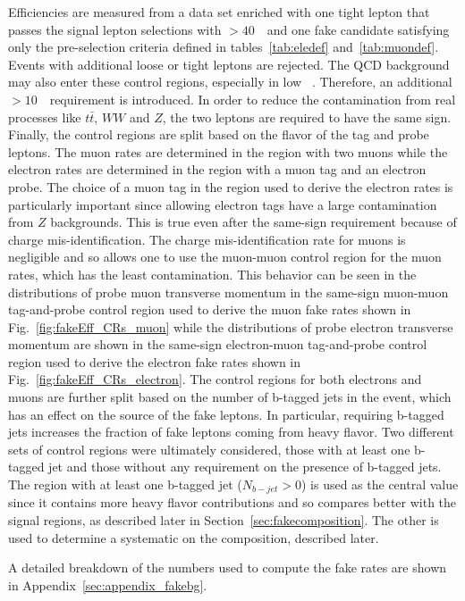 Efficiencies are measured from a data set enriched with one tight lepton that passes the signal lepton selections with \pt$>40$~\GeV\ and 
one fake candidate satisfying only the pre-selection criteria defined in tables~\ref{tab:eledef} and~\ref{tab:muondef}. Events with additional loose or tight leptons are rejected. 
The QCD background may also enter these control regions, especially in low \met\ . Therefore, an additional \met$>10$~\GeV\ requirement is introduced. 
In order to reduce the contamination from real processes like $t\bar{t}$, $WW$ and $Z$, the two leptons are required to have the same sign.
Finally, the control regions are split based on the flavor of the tag and probe leptons.  The muon rates are determined in the region
with two muons while the electron rates are determined in the region with a muon tag and an electron probe.  The choice of a muon tag 
in the region used to derive the electron rates is particularly important since allowing electron tags have a large contamination from $Z$ backgrounds.
This is true even after the same-sign requirement because of charge mis-identification.  
The charge mis-identification rate for muons is negligible
and so allows one to use the muon-muon control region for the muon rates, which has the least contamination.
This behavior can be seen in the distributions of probe muon transverse momentum in the same-sign muon-muon tag-and-probe control region used to derive
the muon fake rates shown in Fig.~\ref{fig:fakeEff_CRs_muon} while
the distributions of probe electron transverse momentum are shown in the same-sign electron-muon tag-and-probe control region used to derive
the electron fake rates shown in Fig.~\ref{fig:fakeEff_CRs_electron}.
The control regions for both electrons and muons are further split based on the number of b-tagged jets in the event, 
which has an effect on the source of the fake leptons.  In particular, requiring b-tagged jets increases the fraction
of fake leptons coming from heavy flavor. Two different sets of control regions were ultimately considered, those
with at least one b-tagged jet and those without any requirement on the presence of b-tagged jets.  The region
with at least one b-tagged jet ($N_{b-jet} > 0$) is used as the central value since it contains more heavy flavor contributions
and so compares better with the signal regions, as described later in Section~\ref{sec:fakecomposition}.  The other is used 
to determine a systematic on the composition, described later.  


A detailed breakdown of the numbers used to compute the fake rates are shown in Appendix~\ref{sec:appendix_fakebg}.


